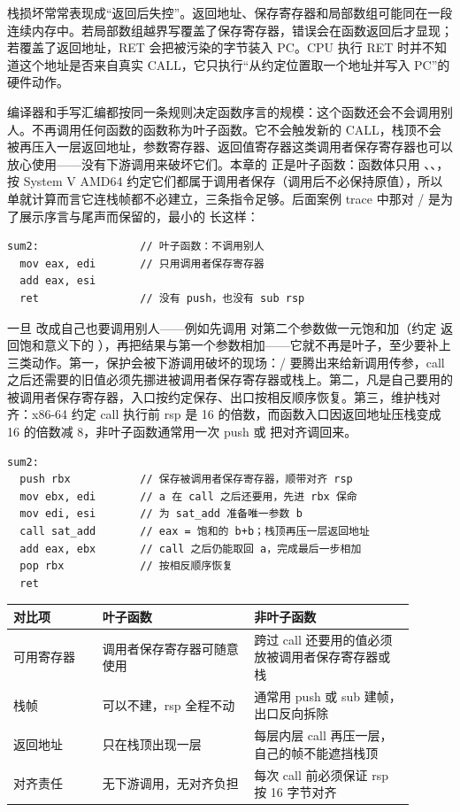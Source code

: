 栈损坏常常表现成“返回后失控”。返回地址、保存寄存器和局部数组可能同在一段连续内存中。若局部数组越界写覆盖了保存寄存器，错误会在函数返回后才显现；若覆盖了返回地址，RET 会把被污染的字节装入 PC。CPU 执行 RET 时并不知道这个地址是否来自真实 CALL，它只执行“从约定位置取一个地址并写入 PC”的硬件动作。

编译器和手写汇编都按同一条规则决定函数序言的规模：这个函数还会不会调用别人。不再调用任何函数的函数称为叶子函数。它不会触发新的 CALL，栈顶不会被再压入一层返回地址，参数寄存器、返回值寄存器这类调用者保存寄存器也可以放心使用——没有下游调用来破坏它们。本章的  正是叶子函数：函数体只用 、、，按 System V AMD64 约定它们都属于调用者保存（调用后不必保持原值），所以单就计算而言它连栈帧都不必建立，三条指令足够。后面案例 trace 中那对 / 是为了展示序言与尾声而保留的，最小的  长这样：

\begin{lstlisting}
sum2:                // 叶子函数：不调用别人
  mov eax, edi       // 只用调用者保存寄存器
  add eax, esi
  ret                // 没有 push，也没有 sub rsp
\end{lstlisting}

一旦  改成自己也要调用别人——例如先调用  对第二个参数做一元饱和加（约定  返回饱和意义下的 ），再把结果与第一个参数相加——它就不再是叶子，至少要补上三类动作。第一，保护会被下游调用破坏的现场：/ 要腾出来给新调用传参，call 之后还需要的旧值必须先挪进被调用者保存寄存器或栈上。第二，凡是自己要用的被调用者保存寄存器，入口按约定保存、出口按相反顺序恢复。第三，维护栈对齐：x86-64 约定 call 执行前 rsp 是 16 的倍数，而函数入口因返回地址压栈变成 16 的倍数减 8，非叶子函数通常用一次 push 或  把对齐调回来。

\begin{lstlisting}
sum2:
  push rbx           // 保存被调用者保存寄存器，顺带对齐 rsp
  mov ebx, edi       // a 在 call 之后还要用，先进 rbx 保命
  mov edi, esi       // 为 sat_add 准备唯一参数 b
  call sat_add       // eax = 饱和的 b+b；栈顶再压一层返回地址
  add eax, ebx       // call 之后仍能取回 a，完成最后一步相加
  pop rbx            // 按相反顺序恢复
  ret
\end{lstlisting}

\begin{longtable}{L{0.2\linewidth}L{0.34\linewidth}L{0.36\linewidth}}
\toprule
对比项 & 叶子函数 & 非叶子函数 \\
\midrule
可用寄存器 & 调用者保存寄存器可随意使用 & 跨过 call 还要用的值必须放被调用者保存寄存器或栈 \\
栈帧 & 可以不建，rsp 全程不动 & 通常用 push 或 sub 建帧，出口反向拆除 \\
返回地址 & 只在栈顶出现一层 & 每层内层 call 再压一层，自己的帧不能遮挡栈顶 \\
对齐责任 & 无下游调用，无对齐负担 & 每次 call 前必须保证 rsp 按 16 字节对齐 \\
\bottomrule
\end{longtable}

